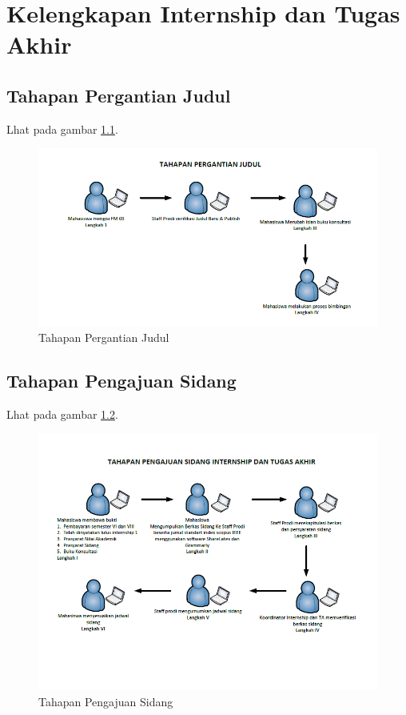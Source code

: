 \chapter{Kelengkapan Internship dan Tugas Akhir}

\section{Tahapan Pergantian Judul}
Lhat pada gambar \ref{figure:P2}.
\begin{figure}[ht]
	\centerline{\includegraphics[width=1\textwidth]{figures/ganti_judul.png}}
	\caption{Tahapan Pergantian Judul}
	\label{figure:P2}
	\end{figure}

\section{Tahapan Pengajuan Sidang}
Lhat pada gambar \ref{figure:P3}.
\begin{figure}[ht]
	\centerline{\includegraphics[width=1\textwidth]{figures/draft.png}}
	\caption{Tahapan Pengajuan Sidang}
	\label{figure:P3}
	\end{figure}
